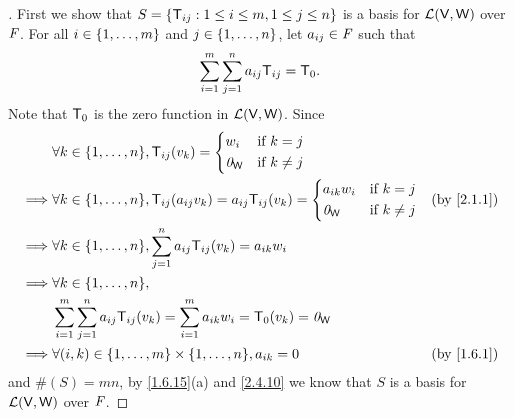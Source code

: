 \begin{proof}[]
  First we show that \(S = \left\lbrace\mathsf{T}_{i j} : 1 \leq i \leq m, 1 \leq j \leq n\right\rbrace\) is a basis for \(\mathcal{L}(\mathsf{V}, \mathsf{W})\) over \(\mathit{F}\).
  For all \(i \in \left\lbrace1, \dots, m\right\rbrace\) and \(j \in \left\lbrace1, \dots, n\right\rbrace\), let \(a_{i j} \in \mathit{F}\) such that
  \[
    \sum_{i = 1}^m \sum_{j = 1}^n a_{i j} \mathsf{T}_{i j} = \mathsf{T}_0.
  \]
  Note that \(\mathsf{T}_0\) is the zero function in \(\mathcal{L}(\mathsf{V}, \mathsf{W})\).
  Since
  \begin{align*}
             & \forall k \in \set{1, \dots, n}, \T_{i j}(v_k) = \begin{dcases}
                                                                  w_i      & \text{if } k = j    \\
                                                                  \zv_{\W} & \text{if } k \neq j
                                                                \end{dcases}                                                      \\
    \implies & \forall k \in \set{1, \dots, n}, \T_{i j}(a_{i j} v_k) = a_{i j} \T_{i j}(v_k) = \begin{dcases}
                                                                                                  a_{i k} w_i & \text{if } k = j    \\
                                                                                                  \zv_{\W}    & \text{if } k \neq j
                                                                                                \end{dcases}        &  & \text{(by \cref{2.1.1})}   \\
    \implies & \forall k \in \set{1, \dots, n}, \sum_{j = 1}^n a_{i j} \T_{i j}(v_k) = a_{i k} w_i                                                  \\
    \implies & \forall k \in \set{1, \dots, n},                                                                                                     \\
             & \sum_{i = 1}^m \sum_{j = 1}^n a_{i j} \T_{i j}(v_k) = \sum_{i = 1}^m a_{i k} w_i = \zT(v_k) = \zv_{\W}                               \\
    \implies & \forall (i, k) \in \set{1, \dots, m} \times \set{1, \dots, n}, a_{i k} = 0                             &  & \text{(by \cref{1.6.1})}
  \end{align*}
  and \(\#(S) = mn\), by \cref{1.6.15}(a) and \cref{2.4.10} we know that \(S\) is a basis for \(\mathcal{L}(\mathsf{V}, \mathsf{W})\) over \(\mathit{F}\).


\end{proof}
